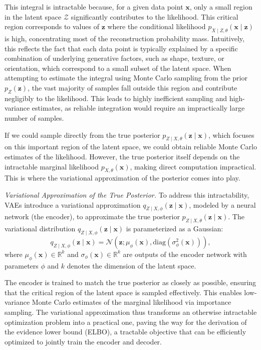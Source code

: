 This integral is intractable because, for a given data point \(\mathbf{x}\), only a small region in the latent space \(\mathcal{Z}\) significantly contributes to the likelihood. This critical region corresponds to values of \(\mathbf{z}\) where the conditional likelihood \(p_{X \mid Z, \theta}(\mathbf{x} \mid \mathbf{z})\) is high, concentrating most of the reconstruction probability mass. Intuitively, this reflects the fact that each data point is typically explained by a specific combination of underlying generative factors, such as shape, texture, or orientation, which correspond to a small subset of the latent space. When attempting to estimate the integral using Monte Carlo sampling from the prior \(p_Z(\mathbf{z})\), the vast majority of samples fall outside this region and contribute negligibly to the likelihood. This leads to highly inefficient sampling and high-variance estimates, as reliable integration would require an impractically large number of samples.

If we could sample directly from the true posterior \(p_{Z \mid X, \theta}(\mathbf{z} \mid \mathbf{x})\), which focuses on this important region of the latent space, we could obtain reliable Monte Carlo estimates of the likelihood. However, the true posterior itself depends on the intractable marginal likelihood \(p_{X, \theta}(\mathbf{x})\), making direct computation impractical. This is where the variational approximation of the posterior comes into play.

\textit{Variational Approximation of the True Posterior.} To address this intractability, VAEs introduce a variational approximation \(q_{Z \mid X, \phi}(\mathbf{z} \mid \mathbf{x})\), modeled by a neural network (the encoder), to approximate the true posterior \(p_{Z \mid X, \theta}(\mathbf{z} \mid \mathbf{x})\). The variational distribution \(q_{Z \mid X, \phi}(\mathbf{z} \mid \mathbf{x})\) is parameterized as a Gaussian:
\[
q_{Z \mid X, \phi}(\mathbf{z} \mid \mathbf{x}) = \mathcal{N}(\mathbf{z}; \mu_\phi(\mathbf{x}), \mathrm{diag}(\sigma_\phi^2(\mathbf{x}))),
\]
where \(\mu_\phi(\mathbf{x}) \in \mathbb{R}^k\) and \(\sigma_\phi(\mathbf{x}) \in \mathbb{R}^k\) are outputs of the encoder network with parameters \(\phi\) and $k$ denotes the dimension of the latent space.

The encoder is trained to match the true posterior as closely as possible, ensuring that the critical region of the latent space is sampled effectively. This enables low-variance Monte Carlo estimates of the marginal likelihood via importance sampling. The variational approximation thus transforms an otherwise intractable optimization problem into a practical one, paving the way for the derivation of the evidence lower bound (ELBO), a tractable objective that can be efficiently optimized to jointly train the encoder and decoder.


